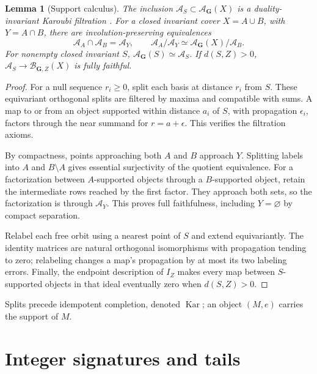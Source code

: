 \documentclass[11pt]{amsart}
\numberwithin{equation}{section}
\newtheorem{lemma}[lemma]{Lemma}
\theoremstyle{definition}
\theoremstyle{remark}
\DeclareMathOperator{\Kar}{Kar}
\begin{document}
\begin{lemma}[Support calculus]\label{alg:filtration}\label{alg:excision}
\label{alg:relabel}\label{alg:separation}
The inclusion $\mathcal A_S\subset\mathcal A_{\mathbf G}(X)$ is a
duality-invariant Karoubi filtration
\cite[Definition 1.27]{CP95}. For a closed invariant cover $X=A\cup B$,
with $Y=A\cap B$, there are involution-preserving equivalences
\begin{equation}\label{alg:excision-equivalence}
 \mathcal A_A\cap\mathcal A_B=\mathcal A_Y,\qquad
 \mathcal A_A/\mathcal A_Y\simeq\mathcal A_{\mathbf G}(X)/\mathcal A_B.
\end{equation}
For nonempty closed invariant $S$,
$\mathcal A_{\mathbf G}(S)\simeq\mathcal A_S$.
If $d(S,Z)>0$, $\mathcal A_S\to\mathcal B_{\mathbf G,Z}(X)$ is fully
faithful.
\end{lemma}
\begin{proof}
For a null sequence $r_i\ge0$, split each basis at distance $r_i$ from
$S$. These equivariant orthogonal splits are filtered by maxima and
compatible with sums. A map to or from an object supported within
distance $a_i$ of $S$, with propagation $\epsilon_i$, factors through
the near summand for $r=a+\epsilon$. This verifies the filtration axioms.

By compactness, points approaching both $A$ and $B$ approach $Y$.
Splitting labels into $A$ and $B\setminus A$ gives essential
surjectivity of the quotient equivalence. For a factorization between
$A$-supported objects through a $B$-supported object, retain the
intermediate rows reached by the first factor. They approach both sets,
so the factorization is through $\mathcal A_Y$. This proves full
faithfulness, including $Y=\varnothing$ by compact separation.

Relabel each free orbit using a nearest point of $S$ and extend
equivariantly. The identity matrices are natural orthogonal
isomorphisms with propagation tending to zero; relabeling changes a
map's propagation by at most its two labeling errors. Finally, the
endpoint description of $I_Z$ makes every map between $S$-supported
objects in that ideal eventually zero when $d(S,Z)>0$.
\end{proof}

Splits precede idempotent completion, denoted $\Kar$; an object $(M,e)$
carries the support of $M$.

\section{Integer signatures and tails}\label{alg:tails}
\end{document}
